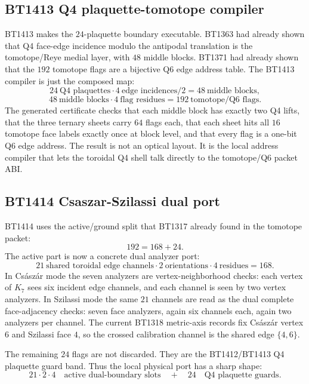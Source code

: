 \documentclass[11pt]{article}
\begin{document}
\subsection{BT1413 Q4 plaquette-tomotope compiler}

BT1413 makes the \(24\)-plaquette boundary executable.  BT1363 had already
shown that Q4 face-edge incidence modulo the antipodal translation is the
tomotope/Reye medial layer, with \(48\) middle blocks.  BT1371 had already
shown that the \(192\) tomotope flags are a bijective Q6 edge address table.
The BT1413 compiler is just the composed map:
\[
  24\ \text{Q4 plaquettes}\cdot4\ \text{edge incidences}/2
  =48\ \text{middle blocks},
\]
\[
  48\ \text{middle blocks}\cdot4\ \text{flag residues}
  =192\ \text{tomotope/Q6 flags}.
\]
The generated certificate checks that each middle block has exactly two Q4
lifts, that the three ternary sheets carry \(64\) flags each, that each sheet
hits all \(16\) tomotope face labels exactly once at block level, and that every
flag is a one-bit Q6 edge address.  The result is not an optical layout.  It is
the local address compiler that lets the toroidal Q4 shell talk directly to the
tomotope/Q6 packet ABI.

\subsection{BT1414 Csaszar-Szilassi dual port}

BT1414 uses the active/ground split that BT1317 already found in the tomotope
packet:
\[
  192=168+24.
\]
The active part is now a concrete dual analyzer port:
\[
  21\ \text{shared toroidal edge channels}\cdot
  2\ \text{orientations}\cdot4\ \text{residues}=168.
\]
In Cs\'asz\'ar mode the seven analyzers are vertex-neighborhood checks: each
vertex of \(K_7\) sees six incident edge channels, and each channel is seen by
two vertex analyzers.  In Szilassi mode the same \(21\) channels are read as the
dual complete face-adjacency checks: seven face analyzers, again six channels
each, again two analyzers per channel.  The current BT1318 metric-axis records
fix Cs\'asz\'ar vertex \(6\) and Szilassi face \(4\), so the crossed calibration
channel is the shared edge \(\{4,6\}\).

The remaining \(24\) flags are not discarded.  They are the BT1412/BT1413 Q4
plaquette guard band.  Thus the local physical port has a sharp shape:
\[
  21\cdot2\cdot4\quad\text{active dual-boundary slots}
  \quad+\quad24\quad\text{Q4 plaquette guards}.
\]
\end{document}

